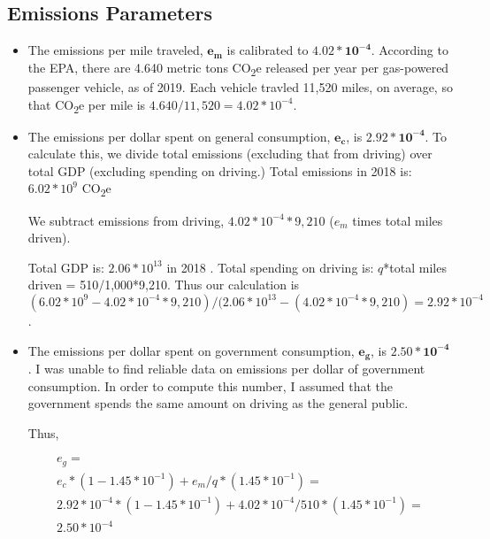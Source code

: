 \documentclass[letter, 12pt, epsf,leqno]{article}
\begin{document}
\subsection{Emissions Parameters}
\begin{itemize}
\item The emissions per mile traveled, $\boldsymbol{e_m}$ is calibrated to $\boldsymbol{4.02*10^{-4}}$.  According to the EPA, there are 4.640 metric tons CO\textsubscript{2}e released per year per gas-powered passenger vehicle, as of 2019.  Each vehicle travled 11,520 miles, on average, so that CO\textsubscript{2}e per mile is $4.640/11,520=4.02*10^{-4}$.  \citep{epa_calculator} %

\item The emissions per dollar spent on general consumption, $\boldsymbol{e_c}$, is $\boldsymbol{2.92*10^{-4}}$.  To calculate this, we divide total emissions (excluding that from driving) over total GDP (excluding spending on driving.)  Total emissions in 2018 is: $6.02 * 10^9$ CO\textsubscript{2}e \citep{climate}  %


We subtract emissions from driving, $4.02*10^{-4} * 9,210$ ($e_m$ times total miles driven).  

Total GDP is: $2.06*10^{13}$ in 2018 \citep{macrotrends_gdp}.  Total spending on driving is: $q$*total miles driven = 510/1,000*9,210.  Thus our calculation is $(6.02 * 10^9 - 4.02*10^{-4} * 9,210) / (2.06*10^{13} - (4.02*10^{-4}*9,210) = 2.92*10^{-4}$.%

\item The emissions per dollar spent on government consumption, $\boldsymbol{e_g}$, is $\boldsymbol{2.50 *10^{-4}}$.  I was unable to find reliable data on emissions per dollar of government consumption.  In order to compute this number, I assumed that the government spends the same amount on driving as the general public.  %

Thus,

\begin{gather}\nonumber e_g =\\
\nonumber e_c * (1 - 1.45 * 10^{-1}) + e_m / q * (1.45 * 10^{-1}) = \\ 
\nonumber 2.92*10^{-4} * (1 - 1.45 * 10^{-1}) + 4.02*10^{-4} / 510 * (1.45 * 10^{-1}) = \\
2.50 * 10^{-4}\end{gather}



\end{itemize}
\end{document}
